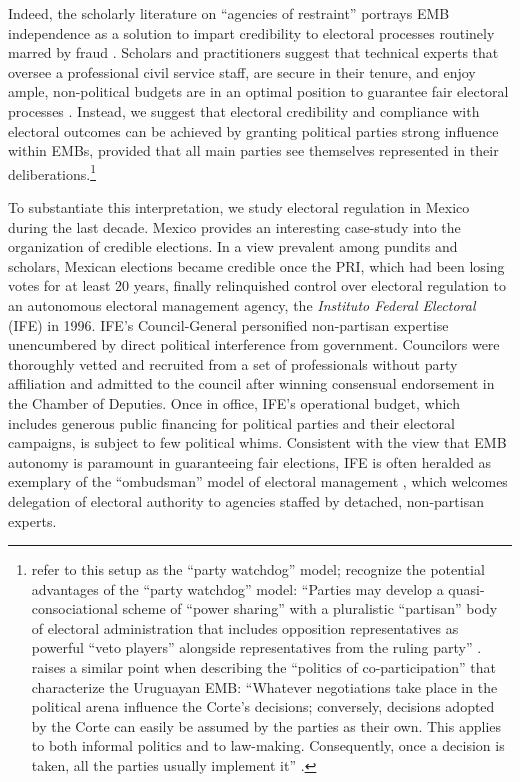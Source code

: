 \documentclass[12 pt, letter]{article}
\begin{document}
Indeed, the scholarly literature on ``agencies of restraint''
portrays EMB independence as a solution to impart credibility to
electoral processes routinely marred by fraud \citep{Schedler1999,
Hartlyn2007}.  Scholars and practitioners suggest that technical
experts that oversee a professional civil service staff, are secure
in their tenure, and enjoy ample, non-political budgets are in an
optimal position to guarantee fair electoral processes \citep[cf.
references in][]{LopezPintor2000, Mozaffar2002}.   Instead, we
suggest that electoral credibility and compliance with electoral
outcomes can be achieved by granting political parties strong
influence within EMBs, provided that all main parties see themselves
represented in their deliberations.\footnote{\citet{Molina1999}
refer to this setup as the ``party watchdog'' model;
\citeauthor{Mozaffar2002a} recognize the potential advantages of the
``party watchdog'' model: ``Parties may develop a
quasi-consociational scheme of ``power sharing'' with a pluralistic
``partisan'' body of electoral administration that includes
opposition representatives as powerful ``veto players'' alongside
representatives from the ruling party'' \citep[p.
16]{Mozaffar2002a}.  \citeauthor{LopezPintor2000} raises a similar
point when describing the ``politics of co-participation'' that
characterize the Uruguayan EMB: ``Whatever negotiations take place
in the political arena influence the Corte's decisions; conversely,
decisions adopted by the Corte can easily be assumed by the parties
as their own. This applies to both informal politics and to
law-making. Consequently, once a decision is taken, all the parties
usually implement it'' \citep[p. 23]{LopezPintor2000}.}

To substantiate this interpretation, we study electoral regulation
in Mexico during the last decade.  Mexico provides an interesting
case-study into the organization of credible elections.  In a view
prevalent among pundits and scholars, Mexican elections became
credible once the PRI, which had been losing votes for at least 20
years, finally relinquished control over electoral regulation to an
autonomous electoral management agency, the \emph{Instituto Federal
Electoral} (IFE) in 1996.   IFE's Council-General personified
non-partisan expertise unencumbered by direct political interference
from government.  Councilors were thoroughly vetted and recruited
from a set of professionals without party affiliation and admitted
to the council after winning consensual endorsement in the Chamber
of Deputies.  Once in office, IFE's operational budget, which
includes generous public financing for political parties and their
electoral campaigns, is subject to few political whims.  Consistent
with the view that EMB autonomy is paramount in guaranteeing fair
elections, IFE is often heralded as exemplary of the ``ombudsman''
model of electoral management \citep{Eisenstadt2004}, which welcomes
delegation of electoral authority to agencies staffed by detached,
non-partisan experts.
\end{document}
